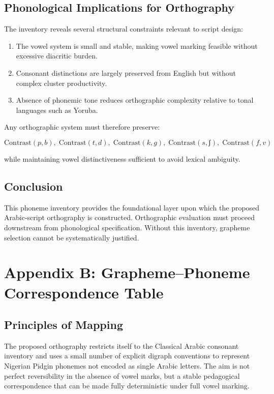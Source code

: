 \documentclass[12pt]{article}
\begin{document}
\subsection{Phonological Implications for Orthography}

The inventory reveals several structural constraints relevant to script design:

\begin{enumerate}
\item The vowel system is small and stable, making vowel marking feasible without excessive diacritic burden.
\item Consonant distinctions are largely preserved from English but without complex cluster productivity.
\item Absence of phonemic tone reduces orthographic complexity relative to tonal languages such as Yoruba.
\end{enumerate}

Any orthographic system must therefore preserve:

\[
\text{Contrast}(p,b),\;
\text{Contrast}(t,d),\;
\text{Contrast}(k,g),\;
\text{Contrast}(s,ʃ),\;
\text{Contrast}(f,v)
\]

while maintaining vowel distinctiveness sufficient to avoid lexical ambiguity.

\subsection{Conclusion}

This phoneme inventory provides the foundational layer upon which the proposed Arabic-script orthography is constructed. Orthographic evaluation must proceed downstream from phonological specification. Without this inventory, grapheme selection cannot be systematically justified.

\section{Appendix B: Grapheme--Phoneme Correspondence Table}

\subsection{Principles of Mapping}

The proposed orthography restricts itself to the Classical Arabic consonant inventory and uses a small number of explicit digraph conventions to represent Nigerian Pidgin phonemes not encoded as single Arabic letters. The aim is not perfect reversibility in the absence of vowel marks, but a stable pedagogical correspondence that can be made fully deterministic under full vowel marking.
\end{document}
